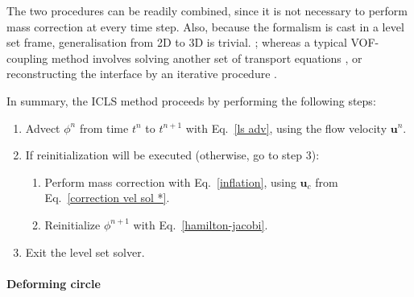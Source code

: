  The two procedures can be readily combined, since it is not necessary to perform mass correction at every time step. Also, because the formalism is cast in a level set frame, generalisation from 2D to 3D is trivial. ; whereas a typical VOF-coupling method involves solving another set of transport equations \citep{Sussman_JCP_2000}, or reconstructing the interface by an iterative procedure \citep{Luo_JCP_2015}.

In summary, the ICLS method proceeds by performing the following steps:

\begin{enumerate}
    \item Advect $\phi^{n}$ from time $t^{n}$ to $t^{n+1}$ with Eq.\ \eqref{ls adv}, using the flow velocity ${\bm u}^{n}$.
    
    \item If reinitialization will be executed (otherwise, go to step 3):
      \begin{enumerate}
        \item Perform mass correction with Eq.\ \eqref{inflation}, using ${\bm u}_c$ from Eq.\ \eqref{correction vel sol *}.
        \item Reinitialize $\phi^{n+1}$ with Eq.\ \eqref{hamilton-jacobi}.
      \end{enumerate}
    
    \item Exit the level set solver.
\end{enumerate}


\paragraph {Deforming circle}

